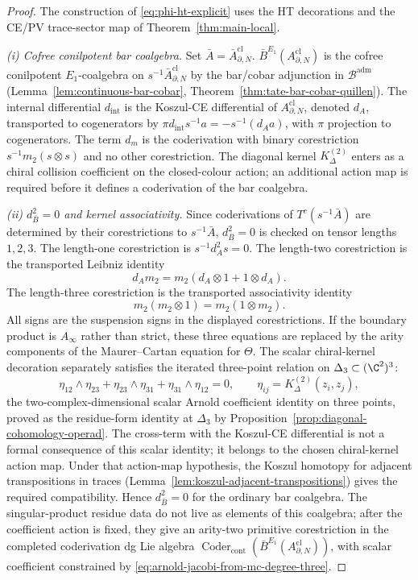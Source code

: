 \begin{proof}
The construction of \eqref{eq:phi-ht-explicit} uses the HT decorations
and the CE/PV trace-sector map of Theorem~\ref{thm:main-local}.

	\emph{(i) Cofree conilpotent bar coalgebra.}
	Set \(\bar A=\bar A^{\mathrm{cl}}_{\partial,N}\).
	\(\bar B^{E_1}(A^{\mathrm{cl}}_{\partial,N})\) is the cofree
	conilpotent \(E_1\)-coalgebra on
	\(s^{-1}\bar A^{\mathrm{cl}}_{\partial,N}\) by the bar/cobar
	adjunction in \(\mathcal B^{\mathrm{adm}}\)
		(Lemma~\ref{lem:continuous-bar-cobar},
			Theorem~\ref{thm:tate-bar-cobar-quillen}).  The internal differential
			\(d_{\mathrm{int}}\) is the Koszul-CE differential of
			\(A^{\mathrm{cl}}_{\partial,N}\), denoted \(d_A\), transported to cogenerators by
		\(\pi d_{\mathrm{int}}s^{-1}a=-s^{-1}(d_Aa)\), with \(\pi\)
		projection to cogenerators.  The term \(d_m\) is
	the coderivation with binary corestriction
	\(s^{-1}m_2(s\otimes s)\) and no other corestriction.  The diagonal
	kernel \(K^{(2)}_\Delta\) enters as a chiral collision coefficient on
	the closed-colour action; an additional action map is required before
	it defines a coderivation of the bar coalgebra.

	\emph{(ii) \(d_{\bar B}^2=0\) and kernel associativity.}
	Since coderivations of \(T^c(s^{-1}\bar A)\) are determined by their
	corestrictions to \(s^{-1}\bar A\), \(d_{\bar B}^2=0\) is checked on
	tensor lengths \(1,2,3\).  The length-one corestriction is
	\(s^{-1}d_A^2s=0\).  The length-two corestriction is the transported
	Leibniz identity
	\[
	  d_A m_2
	    =
	  m_2(d_A\otimes 1+1\otimes d_A).
	\]
	The length-three corestriction is the transported associativity identity
	\[
	  m_2(m_2\otimes1)=m_2(1\otimes m_2).
	\]
	All signs are the suspension signs in the displayed corestrictions.  If
	the boundary product is \(A_\infty\) rather than strict, these three
	equations are replaced by the arity components of the Maurer--Cartan
	equation for \(\Theta\).  The scalar
	chiral-kernel decoration separately satisfies the iterated three-point
relation on \(\Delta_3\subset(\C^2)^3\):
\[
  \eta_{12}\wedge\eta_{23}+\eta_{23}\wedge\eta_{31}
   +\eta_{31}\wedge\eta_{12}=0,\qquad
  \eta_{ij}=K^{(2)}_\Delta(z_i,z_j),
\]
the two-complex-dimensional scalar Arnold coefficient identity on three points, proved as
the residue-form identity at \(\Delta_3\) by
Proposition~\ref{prop:diagonal-cohomology-operad}.  The cross-term
with the Koszul-CE differential is not a formal consequence of this
scalar identity; it belongs to the chosen chiral-kernel action map.
Under that action-map hypothesis, the Koszul homotopy for adjacent
transpositions in traces (Lemma~\ref{lem:koszul-adjacent-transpositions})
gives the required compatibility.  Hence \(d_{\bar B}^2=0\) for the
ordinary bar coalgebra.  The singular-product residue data do not live
as elements of this coalgebra; after the coefficient action is fixed,
they give an arity-two primitive corestriction in the completed
coderivation dg Lie algebra
\(\operatorname{Coder}_{\mathrm{cont}}(\bar B^{E_1}
(A^{\mathrm{cl}}_{\partial,N}))\), with scalar coefficient constrained
by \eqref{eq:arnold-jacobi-from-mc-degree-three}.


\end{proof}
